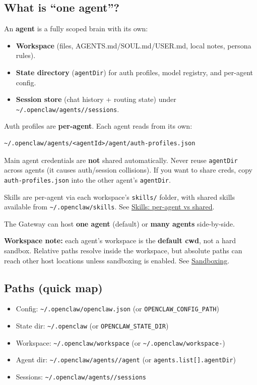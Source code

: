 \subsection{What is “one agent”?}


An \textbf{agent} is a fully scoped brain with its own:

\begin{itemize}
  \item \textbf{Workspace} (files, AGENTS.md/SOUL.md/USER.md, local notes, persona rules).
  \item \textbf{State directory} (\texttt{agentDir}) for auth profiles, model registry, and per-agent config.
  \item \textbf{Session store} (chat history + routing state) under \texttt{\textasciitilde{}/.openclaw/agents//sessions}.
\end{itemize}


Auth profiles are \textbf{per-agent}. Each agent reads from its own:

\begin{lstlisting}
~/.openclaw/agents/<agentId>/agent/auth-profiles.json
\end{lstlisting}


Main agent credentials are \textbf{not} shared automatically. Never reuse \texttt{agentDir}
across agents (it causes auth/session collisions). If you want to share creds,
copy \texttt{auth-profiles.json} into the other agent's \texttt{agentDir}.

Skills are per-agent via each workspace’s \texttt{skills/} folder, with shared skills
available from \texttt{\textasciitilde{}/.openclaw/skills}. See \href{/tools/skills\#per-agent-vs-shared-skills}{Skills: per-agent vs shared}.

The Gateway can host \textbf{one agent} (default) or \textbf{many agents} side-by-side.

\textbf{Workspace note:} each agent’s workspace is the \textbf{default cwd}, not a hard
sandbox. Relative paths resolve inside the workspace, but absolute paths can
reach other host locations unless sandboxing is enabled. See
\href{/gateway/sandboxing}{Sandboxing}.

\subsection{Paths (quick map)}


\begin{itemize}
  \item Config: \texttt{\textasciitilde{}/.openclaw/openclaw.json} (or \texttt{OPENCLAW\_CONFIG\_PATH})
  \item State dir: \texttt{\textasciitilde{}/.openclaw} (or \texttt{OPENCLAW\_STATE\_DIR})
  \item Workspace: \texttt{\textasciitilde{}/.openclaw/workspace} (or \texttt{\textasciitilde{}/.openclaw/workspace-})
  \item Agent dir: \texttt{\textasciitilde{}/.openclaw/agents//agent} (or \texttt{agents.list[].agentDir})
  \item Sessions: \texttt{\textasciitilde{}/.openclaw/agents//sessions}
\end{itemize}


